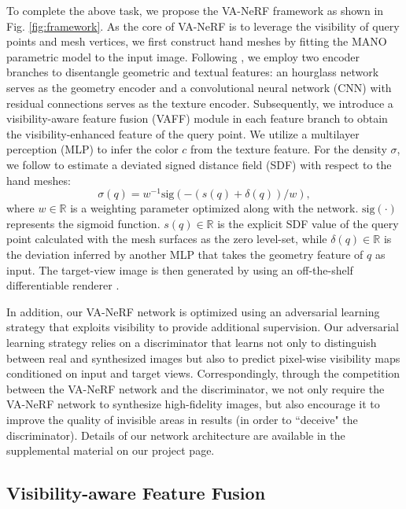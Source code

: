 \documentclass[letterpaper]{article}
\begin{document}
To complete the above task, we propose the VA-NeRF framework as shown in Fig. \ref{fig:framework}. As the core of VA-NeRF is to leverage the visibility of query points and mesh vertices, we first construct hand meshes by fitting the MANO parametric model \cite{romero2017embodied} to the input image. Following \cite{mihajlovic2022keypointnerf}, we employ two encoder branches to disentangle geometric and textual features: an hourglass network \cite{newell2016stacked} serves as the geometry encoder and a convolutional neural network (CNN) with residual connections \cite{johnson2016perceptual} serves as the texture encoder. Subsequently, we introduce a visibility-aware feature fusion (VAFF) module in each feature branch to obtain the visibility-enhanced feature of the query point. We utilize a multilayer perception (MLP) to infer the color $c$ from the texture feature. For the density $\sigma$, we follow \cite{hong2022eva3d} to estimate a deviated signed distance field (SDF) with respect to the hand meshes:
\begin{equation}
    \sigma(q) = {w^{ - 1}}\mathrm{sig}( - (s(q) + \delta (q))/w),
    \label{eq:sdf}
\end{equation}
where $w \in \mathbb{R}$ is a weighting parameter optimized along with the network. $\mathrm{sig}(\cdot)$ represents the sigmoid function. $s(q) \in \mathbb{R}$ is the explicit SDF value of the query point calculated with the mesh surfaces as the zero level-set, while $\delta (q) \in \mathbb{R}$ is the deviation inferred by another MLP that takes the geometry feature of $q$ as input. The target-view image is then generated by using an off-the-shelf differentiable renderer \cite{wang2021ibrnet}.

In addition, our VA-NeRF network is optimized using an adversarial learning strategy that exploits visibility to provide additional supervision. Our adversarial learning strategy relies on a discriminator that learns not only to distinguish between real and synthesized images but also to predict pixel-wise visibility maps conditioned on input and target views. Correspondingly, through the competition between the VA-NeRF network and the discriminator, we not only require the VA-NeRF network to synthesize high-fidelity images, but also encourage it to improve the quality of invisible areas in results (in order to ``deceive" the discriminator). Details of our network architecture are available in the supplemental material on our project page.

\subsection{Visibility-aware Feature Fusion}
\label{sec:attn}
\end{document}
